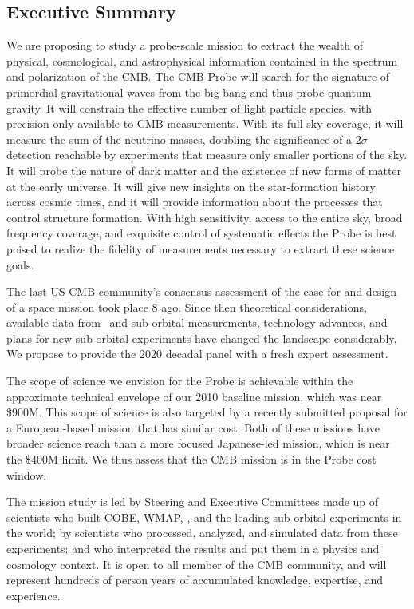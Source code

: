 
\subsection{Executive Summary}
\label{sec:executive}

\vspace{-0.05in}

We are proposing to study a probe-scale mission to extract the wealth 
of physical, cosmological, and astrophysical information contained in the spectrum and polarization of the \ac{CMB}. 
The CMB Probe will search for the signature of primordial gravitational waves from the big bang 
and thus probe quantum gravity. It will constrain the effective 
number of light particle species, with precision only available to CMB measurements. 
With its full sky coverage, it will measure the sum of the neutrino masses, doubling 
the significance of a $2\sigma$ detection reachable 
by experiments that measure only smaller portions of the sky. It will probe 
the nature of dark matter and the existence of new forms of matter at the early universe.  It will 
give new insights on the star-formation history across cosmic times, and it will provide information about 
the processes that control structure formation. 
With high sensitivity, access to the entire sky, broad frequency coverage,  
and exquisite control of systematic effects the Probe is best poised to realize the fidelity of measurements 
necessary to extract these science goals. 

The last US CMB community's consensus assessment of the case for 
and design of a space mission took place 8 ago. %
Since then theoretical considerations, available data from \planck\ and sub-orbital measurements, technology advances, 
and plans for new sub-orbital experiments have changed the landscape considerably. 
We propose to provide the 2020 decadal panel with a fresh expert assessment. 

The scope of science we envision for the Probe is achievable within the approximate technical 
envelope of our 2010 baseline mission, which was near \$900M. This scope of science 
is also targeted by a recently submitted proposal for a European-based mission that has 
similar cost.  Both of these missions have broader science reach than a 
more focused Japanese-led mission, which 
is near the \$400M limit. We thus assess that the CMB mission is in the Probe cost window. 

The mission study is led by Steering 
and Executive Committees made up of scientists who built COBE, WMAP, \planck , and the 
leading sub-orbital experiments in the world; by scientists who processed, analyzed, and simulated data from 
these experiments; and who interpreted the results and put them in a physics and cosmology context. 
It is open to all member of the CMB community, and will represent hundreds of person years of 
accumulated knowledge, expertise, and experience. 

